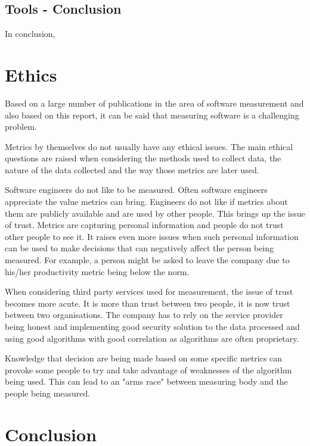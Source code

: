 \documentclass[11pt]{article}
\begin{document}
\subsection{Tools - Conclusion}
In conclusion, 



\section{Ethics}
\label{sec:Ethics}


Based on a large number of publications in the area of software measurement and also based on this report, it can be said that measuring software is a challenging problem.

Metrics by themselves do not usually have any ethical issues. The main ethical questions are raised when considering the methods used to collect data, the nature of the data collected and the way those metrics are later used. 

Software engineers do not like to be measured. 
Often software engineers appreciate the value metrics can bring.
Engineers do not like if metrics about them are publicly available and are used by other people. This brings up the issue of trust. Metrics are capturing personal information and people do not trust other people to see it. It raises even more issues when such personal information can be used to make decisions that can negatively affect the person being measured. For example, a person might be asked to leave the company due to his/her productivity metric being below the norm. 

When considering third party services used for measurement, the issue of trust becomes more acute. It is more than trust between two people, it is now trust between two organisations. The company has to rely on the service provider being honest and implementing good security solution to the data processed and using good algorithms with good correlation as algorithms are often proprietary. 

Knowledge that decision are being made based on some specific metrics can provoke some people to try and take advantage of weaknesses of the algorithm being used. This can lead to an "arms race" between measuring body and the people being measured. 


\section{Conclusion}
\label{sec:Conclusion}

%

 
\end{document}
